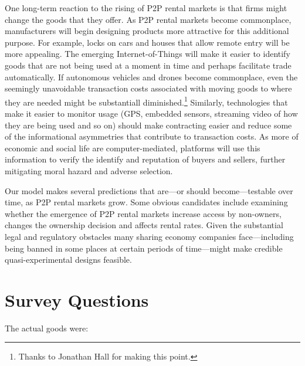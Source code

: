 \documentclass[11pt]{article}
\begin{document}
One long-term reaction to the rising of P2P rental markets is that firms might change the goods that they offer. 
As P2P rental markets become commonplace, manufacturers will begin designing products more attractive for this additional purpose. 
For example, locks on cars and houses that allow remote entry will be more appealing. 
The emerging Internet-of-Things will make it easier to identify goods that are not being used at a moment in time and perhaps facilitate trade automatically.
If autonomous vehicles and drones become commonplace, even the seemingly unavoidable transaction costs associated with moving goods to where they are needed might be substantiall diminished.\footnote{Thanks to Jonathan Hall for making this point.}
Similarly, technologies that make it easier to monitor usage (GPS, embedded sensors, streaming video of how they are being used and so on) should make contracting easier and reduce some of the informational asymmetries that contribute to transaction costs. 
As more of economic and social life are computer-mediated, platforms will use this information to verify the identify and reputation of buyers and sellers, further mitigating moral hazard and adverse selection.  

Our model makes several predictions that are---or should become---testable over time, as P2P rental markets grow.
Some obvious candidates include examining whether the emergence of P2P rental markets increase access by non-owners, changes the ownership decision and affects rental rates.
Given the substantial legal and regulatory obstacles many sharing economy companies face---including being banned in some places at certain periods of time---might make credible quasi-experimental designs feasible. 





\newpage 

\appendix 

\section{Survey Questions \label{sec:survey}} 

The actual goods were: 
\end{document}
